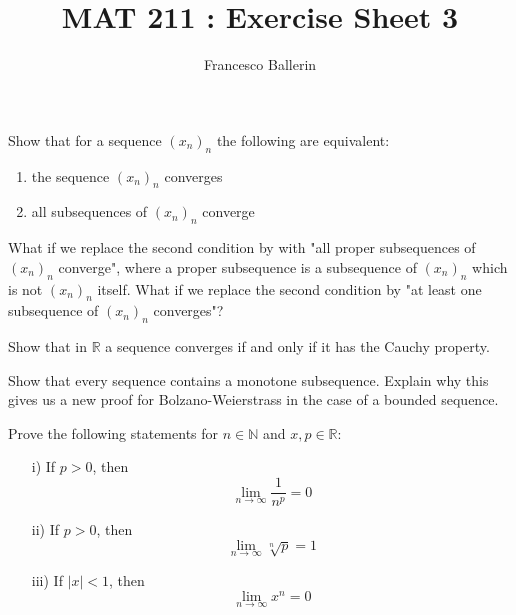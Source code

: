 \documentclass[11pt]{article}%
\title{MAT 211 : Exercise Sheet 3}
\author{Francesco Ballerin}
\date{\color{gray}{\small{francesco.ballerin@uib.no}}}
\begin{document}
\begin{minipage}[t]{\dimexpr \textwidth-6cm-\columnsep}
     \maketitle
\end{minipage}
\hfill\noindent{}

\vspace{50pt}

\begin{Exercise}[title=**$\dagger$]
	Show that for a sequence $(x_n)_n$ the following are equivalent:
	\begin{enumerate}
		\item the sequence $(x_n)_n$ converges
		\item all subsequences of $(x_n)_n$ converge
	\end{enumerate}
	
	What if we replace the second condition by with "all proper subsequences of $(x_n)_n$ converge", where a proper subsequence is a subsequence of $(x_n)_n$ which is not $(x_n)_n$ itself. What if we replace the second condition by "at least one subsequence of $(x_n)_n$ converges"?
\end{Exercise}

\begin{Exercise}[title=**$\dagger$]
	Show that in $\mathbb{R}$ a sequence converges if and only if it has the Cauchy property.
\end{Exercise}

\begin{Exercise}[title=**]
	Show that every sequence contains a monotone subsequence. Explain why this gives us a new proof for Bolzano-Weierstrass in the case of a bounded sequence.
\end{Exercise}

\begin{Exercise}[title=**]
	Prove the following statements for $n\in \mathbb{N}$ and $x,p\in\mathbb{R}$:
	\begin{enumerate}
		\item[i)]{If $p>0$, then $$\lim\limits_{n\to\infty}\frac{1}{n^p}=0$$}
		\item[ii)]{If $p>0$, then $$\lim\limits_{n\to\infty}\sqrt[n]{p}=1$$}
		\item[iii)]{If $|x|<1$, then $$\lim\limits_{n\to\infty}x^n=0$$}
	\end{enumerate}
\end{Exercise}
\end{document}
